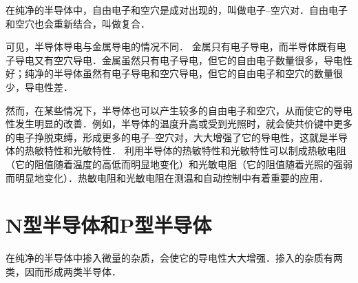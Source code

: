 在纯净的半导体中，自由电子和空穴是成对出现的，叫做电子--空穴对．自由电子和空穴也会重新结合，叫做复合．

可见，半导体导电与金属导电的情况不同．
金属只有电子导电，而半导体既有电子导电又有空穴导电．金属虽然只有电子导电，但它的自由电子数量很多，导电性好；纯净的半导体虽然有电子导电和空穴导电，但它的自由电子和空穴的数量很少，导电性差．

然而，在某些情况下，半导体也可以产生较多的自由电子和空穴，从而使它的导电性发生明显的改善．例如，半导体的温度升高或受到光照时，就会使共价键中更多的电子挣脱束缚，形成更多的电子--空穴对，大大增强了它的导电性，这就是半导体的热敏特性和光敏特性．
利用半导体的热敏特性和光敏特性可以制成热敏电阻（它的阻值随着温度的高低而明显地变化）和光敏电阻（它的阻值随着光照的强弱而明显地变化）．热敏电阻和光敏电阻在测温和自动控制中有着重要的应用．

\section{N型半导体和P型半导体}
在纯净的半导体中掺入微量的杂质，会使它的导电性大大增强．掺入的杂质有两类，因而形成两类半导体．

